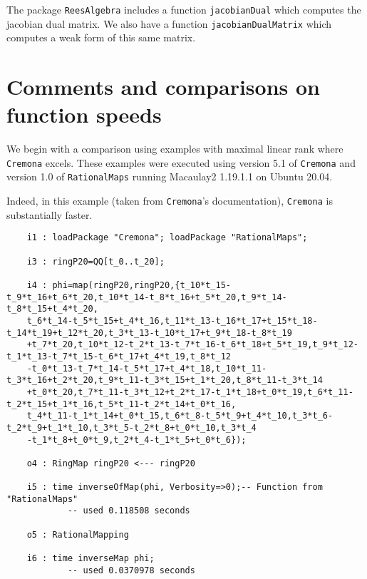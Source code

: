 \documentclass[11pt]{amsart}%
\numberwithin{equation}{theorem}
\renewcommand{\:}{\colon}
\theoremstyle{theorem}
\begin{document}
{{The package {\tt ReesAlgebra} \cite{ReesAlgebraSource, ReesAlgebraArticle} includes a function {\tt jacobianDual} which computes the jacobian dual matrix.  We also have a function {\tt jacobianDualMatrix} which computes a weak form of this same matrix.

\section{Comments and comparisons on function speeds}
\noindent
We begin with a comparison using examples with maximal linear rank where {\tt Cremona} excels.  These examples were executed using version 5.1 of {\tt Cremona} and version 1.0 of {\tt RationalMaps} running Macaulay2 1.19.1.1 on Ubuntu 20.04.

Indeed, in this example (taken from {\tt Cremona}'s documentation), {\tt Cremona} is substantially faster.
{\scriptsize
\color{blue}\begin{verbatim}
    i1 : loadPackage "Cremona"; loadPackage "RationalMaps";

    i3 : ringP20=QQ[t_0..t_20];    

    i4 : phi=map(ringP20,ringP20,{t_10*t_15-t_9*t_16+t_6*t_20,t_10*t_14-t_8*t_16+t_5*t_20,t_9*t_14-t_8*t_15+t_4*t_20,
    t_6*t_14-t_5*t_15+t_4*t_16,t_11*t_13-t_16*t_17+t_15*t_18-t_14*t_19+t_12*t_20,t_3*t_13-t_10*t_17+t_9*t_18-t_8*t_19
    +t_7*t_20,t_10*t_12-t_2*t_13-t_7*t_16-t_6*t_18+t_5*t_19,t_9*t_12-t_1*t_13-t_7*t_15-t_6*t_17+t_4*t_19,t_8*t_12
    -t_0*t_13-t_7*t_14-t_5*t_17+t_4*t_18,t_10*t_11-t_3*t_16+t_2*t_20,t_9*t_11-t_3*t_15+t_1*t_20,t_8*t_11-t_3*t_14
    +t_0*t_20,t_7*t_11-t_3*t_12+t_2*t_17-t_1*t_18+t_0*t_19,t_6*t_11-t_2*t_15+t_1*t_16,t_5*t_11-t_2*t_14+t_0*t_16,
    t_4*t_11-t_1*t_14+t_0*t_15,t_6*t_8-t_5*t_9+t_4*t_10,t_3*t_6-t_2*t_9+t_1*t_10,t_3*t_5-t_2*t_8+t_0*t_10,t_3*t_4
    -t_1*t_8+t_0*t_9,t_2*t_4-t_1*t_5+t_0*t_6});

    o4 : RingMap ringP20 <--- ringP20                                                                     

    i5 : time inverseOfMap(phi, Verbosity=>0);-- Function from "RationalMaps"                              
            -- used 0.118508 seconds                                                                             
    
    o5 : RationalMapping

    i6 : time inverseMap phi;
            -- used 0.0370978 seconds                                                                            
    

\end{verbatim}}}}
\end{document}
